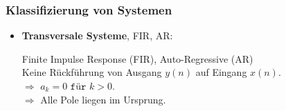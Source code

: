 \subsubsection{Klassifizierung von Systemen}
\begin{itemize}[leftmargin=*]
	\item \textbf{Transversale Systeme}, FIR, AR:
	
	{\small Finite Impulse Response (FIR), Auto-Regressive (AR)\\
		Keine Rückführung von Ausgang $y(n)$ auf Eingang $x(n)$.}\\
	$\Rightarrow$ $a_k=0 \texttt{ für } k>0$.\\
	$\Rightarrow$ Alle Pole liegen im Ursprung.
	
	

\end{itemize}
